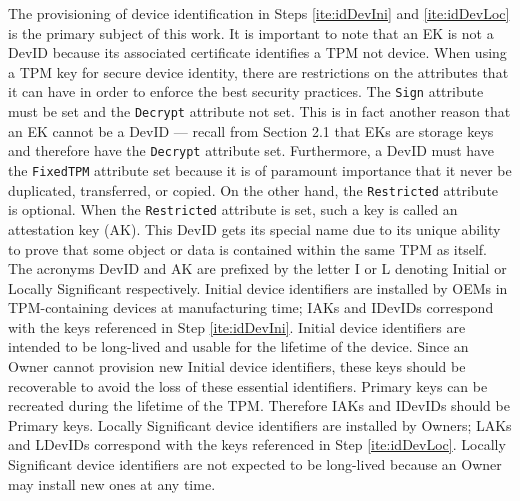 The provisioning of device identification in Steps \ref{ite:idDevIni} and \ref{ite:idDevLoc} is the primary subject of this work. It is important to note that an EK is not a DevID because its associated certificate identifies a TPM not device. 
When using a TPM key for secure device identity, there are restrictions on the attributes that it can have in order to enforce the best security practices. The \verb|Sign| attribute must be set and the \verb|Decrypt| attribute not set. This is in fact another reason that an EK cannot be a DevID --- recall from Section 2.1 that EKs are storage keys and therefore have the \verb|Decrypt| attribute set. Furthermore, a DevID must have the \verb|FixedTPM| attribute set because it is of paramount importance that it never be duplicated, transferred, or copied. On the other hand, the \verb|Restricted| attribute is optional. When the \verb|Restricted| attribute is set, such a key is called an attestation key (AK). This DevID gets its special name due to its unique ability to prove that some object or data is contained within the same TPM as itself. The acronyms DevID and AK are prefixed by the letter I or L denoting Initial or Locally Significant respectively. Initial device identifiers are installed by OEMs in TPM-containing devices at manufacturing time; IAKs and IDevIDs correspond with the keys referenced in Step \ref{ite:idDevIni}. Initial device identifiers are intended to be long-lived and usable for the lifetime of the device. Since an Owner cannot provision new Initial device identifiers, these keys should be recoverable to avoid the loss of these essential identifiers. Primary keys can be recreated during the lifetime of the TPM. Therefore IAKs and IDevIDs should be Primary keys. Locally Significant device identifiers are installed by Owners; LAKs and LDevIDs correspond with the keys referenced in Step \ref{ite:idDevLoc}. Locally Significant device identifiers are not expected to be long-lived because an Owner may install new ones at any time. 


